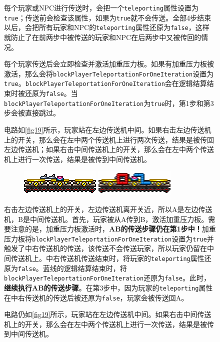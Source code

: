 \begin{figure}[!ht]
每个玩家或NPC进行传送时，会把一个\lstinline{teleporting}属性设置为\lstinline{true}；传送前会检查该属性，如果为\lstinline{true}就不会传送。全部4步结束以后，会把所有玩家和NPC的\lstinline{teleporting}属性还原为\lstinline{false}，这样就防止了在前两步中被传送的玩家和NPC在后两步中又被传回的情况。

每个玩家传送后会立即检查并激活加重压力板。如果有加重压力板被激活，那么会将\lstinline{blockPlayerTeleportationForOneIteration}设置为\lstinline{true}。\lstinline{blockPlayerTeleportationForOneIteration}会在逻辑结算结束时被还原为\lstinline{false}。当\lstinline{blockPlayerTeleportationForOneIteration}为\lstinline{true}时，第1步和第3步会被直接跳过。

\begin{example}
电路如\autoref{fig19}所示，玩家站在左边传送机中间。如果右击左边传送机上的开关，那么会在左中两个传送机上进行两次传送，结果是被传回左边传送机；如果右击中间传送机上的开关，那么会在左中两个传送机上进行一次传送，结果是被传到中间传送机。

\begin{figure}[!ht]
\centering
\includegraphics{images/379.png}
\qquad
\includegraphics{images/380.png}
\caption{}\label{fig19}
\end{figure}

右击左边传送机上的开关，左边传送机离开关近，所以A是左边传送机，B是中间传送机。首先，玩家被从A传到B，激活加重压力板。需要注意的是，加重压力板激活时，\textbf{AB的传送步骤仍在第1步中！}加重压力板将\lstinline{blockPlayerTeleportationForOneIteration}设置为\lstinline{true}并触发了中右传送机的传送，该传送不会传送玩家，所以玩家仍留在中间传送机上。中右传送机传送结束时，将玩家的\lstinline{teleporting}属性还原为\lstinline{false}。蓝线的逻辑结算结束时，将\lstinline{blockPlayerTeleportationForOneIteration}还原为\lstinline{false}。此时，\textbf{继续执行AB的传送步骤}。在第3步中，因为玩家的\lstinline{teleporting}属性在中右传送机的传送后被还原为\lstinline{false}，玩家会被传送回A。
\end{example}

\begin{example}
电路仍如\autoref{fig19}所示，玩家站在左边传送机中间。如果右击中间传送机上的开关，那么会在左中两个传送机上进行一次传送，结果是被传到中间传送机。


\end{example}
\end{figure}
